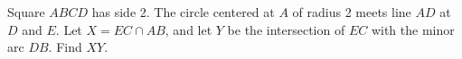 Square $ABCD$ has side 2. The circle centered at $A$ of radius 2 meets line $AD$ at $D$ and $E$. Let $X=EC\cap AB$, and let $Y$ be the intersection of $EC$ with the minor arc $DB$. Find $XY$.
